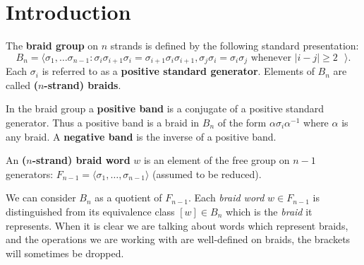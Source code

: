 \documentclass[12pt]{thesis}
\begin{document}
% 

\tableofcontents
\listoffigures

\mainmatter

\chapter{Introduction}

\begin{definition}
    The \textbf{braid group} on $n$ strands is defined by the following standard presentation:
    \[
    B_{n} = \langle \sigma_{1}, \ldots \sigma_{n - 1} \colon \sigma_{i}\sigma_{i + 1}\sigma_{i} = \sigma_{i + 1} \sigma_{i} \sigma_{i + 1},
     \sigma_{j}\sigma_{i} = \sigma_{i}\sigma_{j} \text{ whenever $|i - j| \geq 2$ } \rangle.
    \]
    Each $\sigma_{i}$ is referred to as a \textbf{positive standard generator}.
    Elements of $B_{n}$ are called \textbf{($n$-strand) braids}.
\end{definition}

\begin{definition}
    In the braid group a \textbf{positive band} is a conjugate of a positive standard generator.
    Thus a positive band is a braid in $B_{n}$ of the form $\alpha \sigma_{i} \alpha^{-1}$ 
    where $\alpha$ is any braid.
    A \textbf{negative band} is the inverse of a positive band.
\end{definition}

\begin{definition}
    An \textbf{($n$-strand) braid word} $w$ is an element of the free group on $n-1$ generators: $F_{n-1} = \langle \sigma_{1}, \ldots, \sigma_{n-1} \rangle$ (assumed to be reduced).
\end{definition}

We can consider $B_{n}$ as a quotient of $F_{n-1}$.
Each \textit{braid word} $w \in F_{n-1}$ is distinguished from its equivalence class $[w] \in B_{n}$
which is the \textit{braid} it represents.
When it is clear we are talking about words which represent braids, and
the operations we are working with
are well-defined on braids, the brackets will sometimes be dropped.
\end{document}

